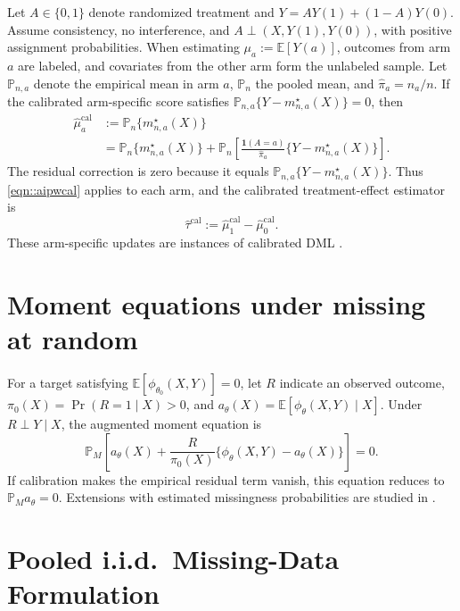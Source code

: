 \documentclass{article}
\theoremstyle{plain}
\theoremstyle{definition}
\newcommand{\E}{\mathbb{E}}
\newcommand{\1}{\mathbf{1}}
\begin{document}
Let \(A\in\{0,1\}\) denote randomized treatment and
\(Y=AY(1)+(1-A)Y(0)\). Assume consistency, no interference, and
\(A\perp(X,Y(1),Y(0))\), with positive assignment probabilities.
When estimating \(\mu_a:=\E[Y(a)]\), outcomes from arm \(a\) are labeled,
and covariates from the other arm form the unlabeled sample.
Let \(\mathbb P_{n,a}\) denote the empirical mean in arm \(a\),
\(\mathbb P_n\) the pooled mean, and \(\hat\pi_a=n_a/n\).
If the calibrated arm-specific score satisfies
\(\mathbb P_{n,a}\{Y-m_{n,a}^\star(X)\}=0\), then
\begin{align}
\hat\mu_a^{\mathrm{cal}}
&:=\mathbb P_n\{m_{n,a}^\star(X)\}\label{eq:rct-mua-plugin}\\
&=\mathbb P_n\{m_{n,a}^\star(X)\}
+\mathbb P_n\left[
\frac{\1(A=a)}{\hat\pi_a}\{Y-m_{n,a}^\star(X)\}
\right].\label{eq:rct-mua-aipw}
\end{align}
The residual correction is zero because it equals
\(\mathbb P_{n,a}\{Y-m_{n,a}^\star(X)\}\).
Thus \eqref{eqn::aipwcal} applies to each arm, and the calibrated
treatment-effect estimator is
\begin{equation}
\label{eq:rct-ate}
\hat\tau^{\mathrm{cal}}:=\hat\mu_1^{\mathrm{cal}}-\hat\mu_0^{\mathrm{cal}}.
\end{equation}
These arm-specific updates are instances of calibrated DML
\citep{van2024automatic}.

\section{Moment equations under missing at random}
\label{appendix::momentgeneral}
For a target satisfying \(\E[\phi_{\theta_0}(X,Y)]=0\), let
\(R\) indicate an observed outcome, \(\pi_0(X)=\Pr(R=1\mid X)>0\), and
\(a_\theta(X)=\E[\phi_\theta(X,Y)\mid X]\).
Under \(R\perp Y\mid X\), the augmented moment equation is
\[
\mathbb P_M\left[
a_\theta(X)+\frac R{\pi_0(X)}\{\phi_\theta(X,Y)-a_\theta(X)\}
\right]=0.
\]
If calibration makes the empirical residual term vanish, this equation reduces
to \(\mathbb P_M a_\theta=0\). Extensions with estimated missingness probabilities
are studied in \citet{robins1994estimation,robins1995analysis,van2024automatic}.

\section{Pooled i.i.d.\ Missing-Data Formulation}
\label{app:iid}
\end{document}
